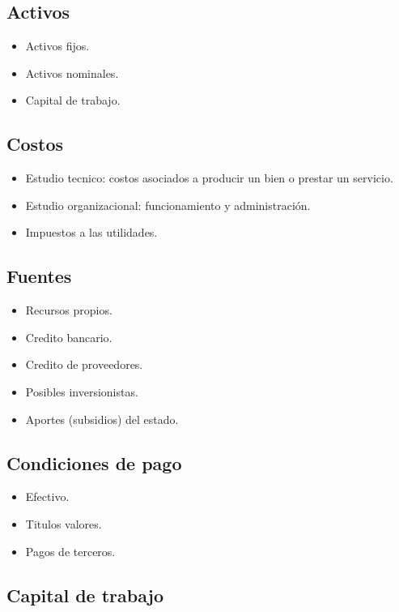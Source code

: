 \documentclass[a4paper, 11pt, oneside]{article}
\begin{document}
\subsection{Activos}

\begin{itemize}
	\item Activos fijos.
	\item Activos nominales.
	\item Capital de trabajo.
\end{itemize}

\subsection{Costos}

\begin{itemize}
	\item Estudio tecnico: costos asociados a producir un bien o prestar un servicio.
	\item Estudio organizacional: funcionamiento y administración.
	\item Impuestos a las utilidades.
\end{itemize}

\subsection{Fuentes}

\begin{itemize}
	\item Recursos propios.
	\item Credito bancario.
	\item Credito de proveedores.
	\item Posibles inversionistas.
	\item Aportes (subsidios) del estado.
\end{itemize}

\subsection{Condiciones de pago}

\begin{itemize}
	\item Efectivo.
	\item Titulos valores.
	\item Pagos de terceros.
\end{itemize}

\subsection{Capital de trabajo}
\end{document}
